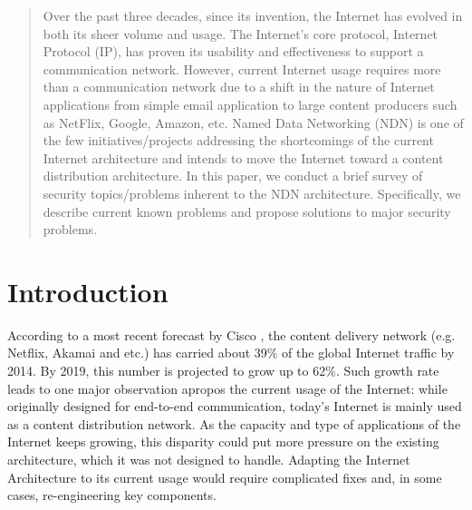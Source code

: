 \documentclass[conference,compsoc]{IEEEtran}
\begin{document}




\maketitle

\begin{abstract}
Over the past three decades, since its invention, the Internet has evolved in both its sheer volume and usage. The Internet's core protocol, Internet Protocol (IP), has proven its usability and effectiveness to support a communication network. However, current Internet usage requires more than a communication network due to a shift in the nature of Internet applications from simple email application to large content producers such as NetFlix, Google, Amazon, etc. Named Data Networking (NDN) is one of the few initiatives/projects addressing the shortcomings of the current Internet architecture and intends to move the Internet toward a content distribution architecture. In this paper, we conduct a brief survey of security topics/problems inherent to the NDN architecture. Specifically, we describe current known problems and propose solutions to major security problems. 
\end{abstract}





%
\IEEEpeerreviewmaketitle



\section{Introduction}
\label{introduction}
According to a most recent forecast by Cisco \cite{index2015forecast}, the content delivery network (e.g. Netflix, Akamai and etc.) has carried about 39\% of the global Internet traffic by 2014. By 2019, this number is projected to grow up to 62\%. Such growth rate leads to one major observation apropos the current usage of the Internet: while originally designed for end-to-end communication, today's Internet is mainly used as a content distribution network. As the capacity and type of applications of the Internet keeps growing, this disparity could put more pressure on the existing architecture, which it was not designed to handle. Adapting the Internet Architecture to its current usage would require complicated fixes and, in some cases, re-engineering key components.
\end{document}
